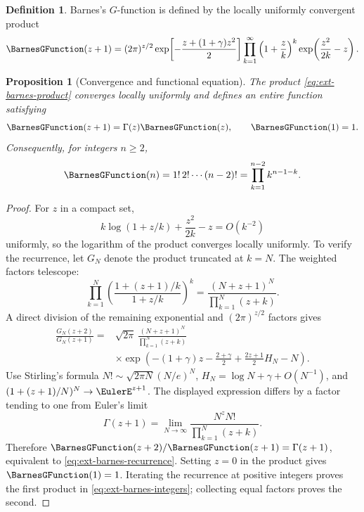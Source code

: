 \documentclass[11pt,a4paper,oneside,openany]{book}
\newtheorem{proposition}[theorem]{Proposition}
\theoremstyle{definition}
\newtheorem{definition}[theorem]{Definition}
\theoremstyle{remark}
\begin{document}
\begin{definition}
Barnes's \(G\)-function is defined by the locally uniformly convergent product
\begin{equation}\label{eq:ext-barnes-product}
 \BarnesGFunction(z+1)=(2\pi)^{z/2}
 \exp\!\left[-\frac{z+(1+\gamma)z^2}{2}\right]
 \prod_{k=1}^\infty
 \left(1+\frac zk\right)^k
 \exp\!\left(\frac{z^2}{2k}-z\right).
\end{equation}
\end{definition}

\begin{proposition}[Convergence and functional equation]
The product \eqref{eq:ext-barnes-product} converges locally uniformly and defines
an entire function satisfying
\begin{equation}\label{eq:ext-barnes-recurrence}
 \BarnesGFunction(z+1)=\Gamma(z)\BarnesGFunction(z),\qquad \BarnesGFunction(1)=1.
\end{equation}
Consequently, for integers \(n\ge2\),
\begin{equation}\label{eq:ext-barnes-integers}
 \BarnesGFunction(n)=1!\,2!\cdots(n-2)!
 =\prod_{k=1}^{n-2}k^{n-1-k}.
\end{equation}
\end{proposition}
\begin{proof}
For \(z\) in a compact set,
\[
 k\log(1+z/k)+\frac{z^2}{2k}-z=O(k^{-2})
\]
uniformly, so the logarithm of the product converges locally uniformly.
To verify the recurrence, let \(G_N\) denote the product truncated at \(k=N\).
The weighted factors telescope:
\[
 \prod_{k=1}^N
 \left(\frac{1+(z+1)/k}{1+z/k}\right)^k
 =\frac{(N+z+1)^N}{\prod_{k=1}^N(z+k)}.
\]
A direct division of the remaining exponential and \((2\pi)^{z/2}\) factors
gives
\begin{align*}
 \frac{G_N(z+2)}{G_N(z+1)}
 ={}&\sqrt{2\pi}\,
 \frac{(N+z+1)^N}{\prod_{k=1}^N(z+k)}\\
 &\times\exp\!\left(
 -(1+\gamma)z-\frac{2+\gamma}{2}
 +\frac{2z+1}{2}H_N-N\right).
\end{align*}
Use Stirling's formula
\(N!\sim\sqrt{2\pi N}(N/e)^N\),
\(H_N=\log N+\gamma+O(N^{-1})\), and
\((1+(z+1)/N)^N\to \EulerE^{z+1}\).  The displayed expression differs by a factor
tending to one from Euler's limit
\[
 \Gamma(z+1)=\lim_{N\to\infty}
 \frac{N^zN!}{\prod_{k=1}^N(z+k)}.
\]
Therefore \(\BarnesGFunction(z+2)/\BarnesGFunction(z+1)=\Gamma(z+1)\), equivalent to
\eqref{eq:ext-barnes-recurrence}.  Setting \(z=0\) in the product gives
\(\BarnesGFunction(1)=1\).  Iterating the recurrence at positive integers proves the first
product in \eqref{eq:ext-barnes-integers}; collecting equal factors proves the
second.
\end{proof}
\end{document}
